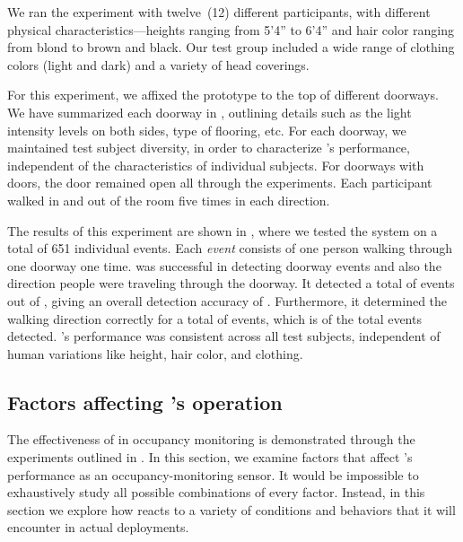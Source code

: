 We ran the experiment with twelve~(12) different participants, with different physical characteristics---heights ranging from 5'4'' to 6'4'' and hair color ranging from blond to brown and black.
Our test group included a wide range of clothing colors (light and dark) and a variety of head coverings.


For this experiment, we affixed the \sysname prototype to the top of \numDoors different doorways.
We have summarized each doorway in , outlining details such as the light intensity levels on both sides, type of flooring, etc.
For each doorway, we maintained test subject diversity, in order to characterize \sysname's performance, independent of the characteristics of individual subjects.
For doorways with doors, the door remained open all through the experiments.
Each participant walked in and out of the room five times in each direction.

The results of this experiment are shown in , where we tested the system on a total of 651 individual events.
Each \textit{event} consists of one person walking through one doorway one time.
\sysname was successful in detecting doorway events and also the direction people were traveling through the doorway.
It detected a total of \numDet events out of \numExp, giving an overall detection accuracy of \SysAccuracy.
Furthermore, it determined the walking direction correctly for a total of \numDir events, which is \dirAccuracy of the total events detected.
\sysname's performance was consistent across all test subjects, independent of human variations like height, hair color, and clothing.



\subsection{Factors affecting \sysname's operation}
\label{sec:confounding}

The effectiveness of \sysname in occupancy monitoring is demonstrated through the experiments outlined in .
In this section, we examine factors that affect \sysname's performance as an occupancy-monitoring sensor.
It would be impossible to exhaustively study all possible combinations of every factor.
Instead, in this section we explore how \sysname reacts to a variety of conditions and behaviors that it will encounter in actual deployments.


